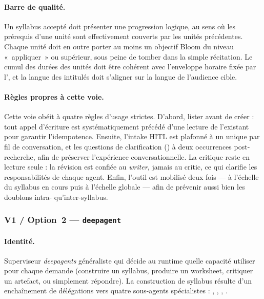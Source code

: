 \paragraph{Barre de qualité.} Un syllabus accepté doit présenter
une progression logique, au sens où les prérequis d'une unité sont
effectivement couverts par les unités précédentes. Chaque unité
doit en outre porter au moins un objectif Bloom du niveau
«~appliquer~» ou supérieur, sous peine de tomber dans la simple
récitation. Le cumul des durées des unités doit être cohérent avec
l'enveloppe horaire fixée par l', et la langue
des intitulés doit s'aligner sur la langue de l'audience cible.

\paragraph{Règles propres à cette voie.} Cette voie obéit à quatre
règles d'usage strictes. D'abord, lister avant de créer : tout appel
d'écriture est systématiquement précédé d'une lecture de l'existant
pour garantir l'idempotence. Ensuite, l'intake HITL est plafonné à
un unique  par fil de conversation, et les
questions de clarification () à deux occurrences
post-recherche, afin de préserver l'expérience conversationnelle.
La critique reste en lecture seule : la révision est confiée au
\emph{writer}, jamais au critic, ce qui clarifie les responsabilités
de chaque agent. Enfin, l'outil  est
mobilisé deux fois — à l'échelle du syllabus en cours puis à
l'échelle globale — afin de prévenir aussi bien les doublons intra-
qu'inter-syllabus.

\subsubsection{V1 / Option~2 — \texttt{deepagent}}
\label{sec:v1-op2}

\paragraph{Identité.} Superviseur \emph{deepagents} généraliste qui
décide au runtime quelle capacité utiliser pour chaque demande
(construire un syllabus, produire un worksheet, critiquer un artefact,
ou simplement répondre). La construction de syllabus résulte d'un
enchaînement de délégations  vers quatre
sous-agents spécialistes : ,
, , .

